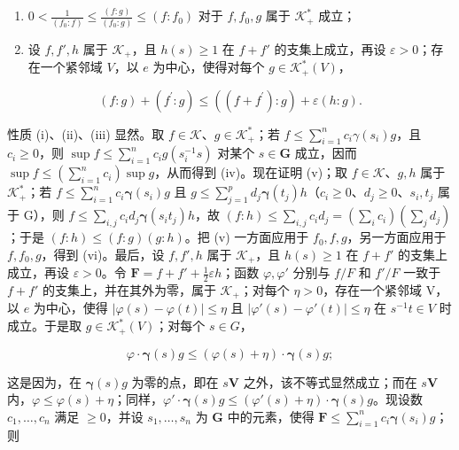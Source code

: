 \begin{enumerate}
\def\labelenumi{(\roman{enumi})}
\setcounter{enumi}{5}
\item
  \(0 < \frac{1}{(f_0:f)}\leqslant \frac{(f:g)}{(f_0:g)}\leqslant (f:f_0)\) 对于 \(f,f_0,g\) 属于 \(\mathcal{K}_+^*\) 成立；
\item
  设 \(f, f', h\) 属于 \(\mathcal{K}_+\)，且 \(h(s) \geqslant 1\) 在 \(f + f'\) 的支集上成立，再设 \(\varepsilon > 0\)；存在一个紧邻域 \(V\)，以 \(e\) 为中心，使得对每个 \(g \in \mathcal{K}_+^*(V)\)，
\end{enumerate}

\[
(f: g) + (f ^ {\prime}: g) \leqslant ((f + f ^ {\prime}): g) + \varepsilon (h: g).
\]

性质 (i)、(ii)、(iii) 显然。取 \(f \in \mathcal{K}\)、\(g \in \mathcal{K}_+^*\)；若 \(f \leqslant \sum_{i=1}^{n} c_i \gamma(s_i)g\)，且 \(c_i \geqslant 0\)，则 \(\sup f \leqslant \sum_{i=1}^{n} c_i g(s_i^{-1}s)\) 对某个 \(s \in \mathbf{G}\) 成立，因而 \(\sup f \leqslant \left( \sum_{i=1}^{n} c_i \right) \sup g\)，从而得到 (iv)。现在证明 (v)；取 \(f \in \mathcal{K}\)、\(g, h\) 属于 \(\mathcal{K}_+^*\)；若 \(f \leqslant \sum_{i=1}^{n} c_i \boldsymbol{\gamma}(s_i) g\) 且 \(g \leqslant \sum_{j=1}^{p} d_j \boldsymbol{\gamma}(t_j) h\)（\(c_i \geqslant 0\)、\(d_j \geqslant 0\)、\(s_i, t_j\) 属于 G），则 \(f \leqslant \sum_{i,j} c_i d_j \boldsymbol{\gamma}(s_i t_j) h\)，故 \((f: h) \leqslant \sum_{i,j} c_i d_j = \left( \sum_{i} c_i \right) \left( \sum_{j} d_j \right)\)；于是 \((f: h) \leqslant (f: g)(g: h)\)。把 (v) 一方面应用于 \(f_0, f, g\)，另一方面应用于 \(f, f_0, g\)，得到 (vi)。最后，设 \(f, f', h\) 属于 \(\mathcal{K}_+\)，且 \(h(s) \geqslant 1\) 在 \(f + f'\) 的支集上成立，再设 \(\varepsilon > 0\)。令 \(\mathbf{F} = f + f' + \frac{1}{2} \varepsilon h\)；函数 \(\varphi, \varphi'\) 分别与 \(f / F\) 和 \(f'/F\) 一致于 \(f + f'\) 的支集上，并在其外为零，属于 \(\mathcal{K}_+\)；对每个 \(\eta > 0\)，存在一个紧邻域 V，以 \(e\) 为中心，使得 \(|\varphi(s) - \varphi(t)| \leqslant \eta\) 且 \(|\varphi'(s) - \varphi'(t)| \leqslant \eta\) 在 \(s^{-1} t \in V\) 时成立。于是取 \(g \in \mathcal{K}_+^*(V)\)；对每个 \(s \in G\)，

\[
\varphi \cdot \boldsymbol {\gamma} (s) g \leqslant (\varphi (s) + \eta) \cdot \boldsymbol {\gamma} (s) g;
\]

这是因为，在 \(\pmb{\gamma}(s)g\) 为零的点，即在 \(s\mathbf{V}\) 之外，该不等式显然成立；而在 \(s\mathbf{V}\) 内，\(\varphi \leqslant \varphi(s) + \eta\)；同样，\(\varphi' \cdot \pmb{\gamma}(s)g \leqslant (\varphi'(s) + \eta) \cdot \pmb{\gamma}(s)g\)。现设数 \(c_1, \ldots, c_n\) 满足 \(\geqslant 0\)，并设 \(s_1, \ldots, s_n\) 为 \(\mathbf{G}\) 中的元素，使得 \(\mathbf{F} \leqslant \sum_{i=1}^{n} c_i \pmb{\gamma}(s_i)g\)；则

